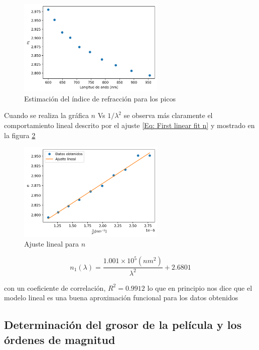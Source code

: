 \documentclass[article]{article}
\begin{document}
\begin{multicols}{2}
        \begin{figure}[H]
        \centering
        \includegraphics[width=7cm]{n_1 data.png}
        \caption{Estimación del índice de refracción para los picos}
        \label{fig: n_1 for peaks}
        \end{figure}
        
        Cuando se realiza la gráfica $n$ Vs $1/\lambda^2$ se observa más claramente el comportamiento lineal descrito por el ajuste \ref{Eq: First linear fit n} y mostrado en la figura \ref{fig: n_1 linear fit}
        
        \begin{figure}[H]
        \centering
        \includegraphics[width=7cm]{n_1 linear fit.png}
        \caption{Ajuste lineal para $n$}
        \label{fig: n_1 linear fit}
        \end{figure}
        
        \begin{equation}
            n_1(\lambda)=\frac{1.001 \times 10^{5} (nm^2)}{\lambda^2}+2.6801
            \label{Eq: First linear fit n}
        \end{equation}
        
        con un coeficiente de correlación, $R^2=0.9912$ lo que en principio nos dice que el modelo lineal es una buena aproximación funcional para los datos obtenidos
        
        \subsection{Determinación del grosor de la película y los órdenes de magnitud}
        

\end{multicols}
\end{document}
